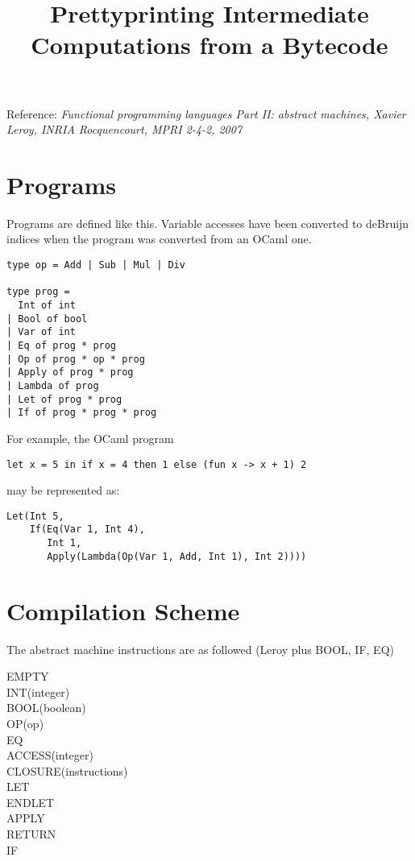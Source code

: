 \documentclass[11pt]{article}
\begin{document}
\title{Prettyprinting Intermediate Computations from a Bytecode}
\maketitle

\noindent Reference: \textit{Functional programming languages Part II: abstract machines, Xavier Leroy, INRIA Rocquencourt, MPRI 2-4-2, 2007}

\section{Programs}

Programs are defined like this. Variable accesses have been converted to deBruijn indices when the program was converted from an OCaml one.

{\small\begin{verbatim}
type op = Add | Sub | Mul | Div

type prog =
  Int of int
| Bool of bool
| Var of int
| Eq of prog * prog
| Op of prog * op * prog
| Apply of prog * prog
| Lambda of prog
| Let of prog * prog
| If of prog * prog * prog\end{verbatim}}

\noindent For example, the OCaml program

\medskip
\noindent\texttt{let x = 5 in if x = 4 then 1 else (fun x -> x + 1) 2}
\medskip

\noindent may be represented as:

\medskip
{\small
\begin{verbatim}Let(Int 5,
    If(Eq(Var 1, Int 4),
       Int 1,
       Apply(Lambda(Op(Var 1, Add, Int 1), Int 2))))\end{verbatim}}


\section{Compilation Scheme}

The abstract machine instructions are as followed (Leroy plus BOOL, IF, EQ)

\medskip

\noindent
EMPTY\\
INT(integer)\\
BOOL(boolean)\\
OP(op)\\
EQ\\
ACCESS(integer)\\
CLOSURE(instructions)\\
LET\\
ENDLET\\
APPLY\\
RETURN\\
IF
\medskip
\end{document}
